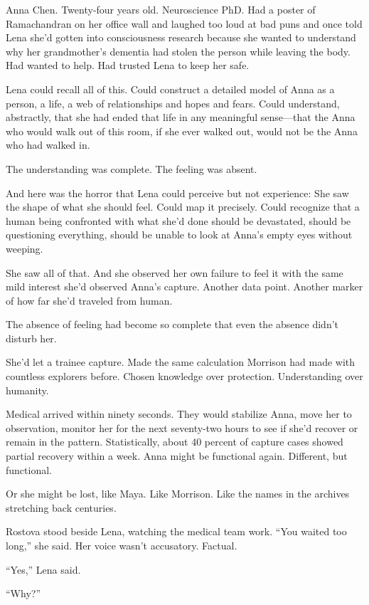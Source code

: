 Anna Chen. Twenty-four years old. Neuroscience PhD. Had a poster of Ramachandran on her office wall and laughed too loud at bad puns and once told Lena she'd gotten into consciousness research because she wanted to understand why her grandmother's dementia had stolen the person while leaving the body. Had wanted to help. Had trusted Lena to keep her safe.

Lena could recall all of this. Could construct a detailed model of Anna as a person, a life, a web of relationships and hopes and fears. Could understand, abstractly, that she had ended that life in any meaningful sense—that the Anna who would walk out of this room, if she ever walked out, would not be the Anna who had walked in.

The understanding was complete. The feeling was absent.

And here was the horror that Lena could perceive but not experience: She saw the shape of what she should feel. Could map it precisely. Could recognize that a human being confronted with what she'd done should be devastated, should be questioning everything, should be unable to look at Anna's empty eyes without weeping.

She saw all of that. And she observed her own failure to feel it with the same mild interest she'd observed Anna's capture. Another data point. Another marker of how far she'd traveled from human.

The absence of feeling had become so complete that even the absence didn't disturb her.

She'd let a trainee capture. Made the same calculation Morrison had made with countless explorers before. Chosen knowledge over protection. Understanding over humanity.

Medical arrived within ninety seconds. They would stabilize Anna, move her to observation, monitor her for the next seventy-two hours to see if she'd recover or remain in the pattern. Statistically, about 40 percent of capture cases showed partial recovery within a week. Anna might be functional again. Different, but functional.

Or she might be lost, like Maya. Like Morrison. Like the names in the archives stretching back centuries.

Rostova stood beside Lena, watching the medical team work. ``You waited too long,'' she said. Her voice wasn't accusatory. Factual.

``Yes,'' Lena said.

``Why?''

